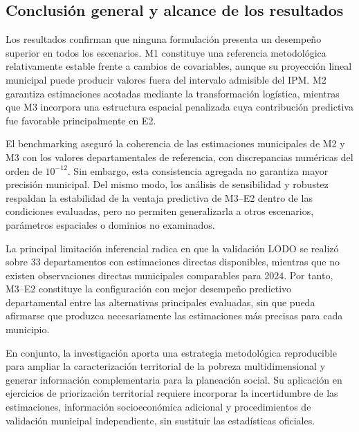 \subsection*{Conclusión general y alcance de los resultados}

Los resultados confirman que ninguna formulación presenta un desempeño superior en todos los escenarios. M1 constituye una referencia metodológica relativamente estable frente a cambios de covariables, aunque su proyección lineal municipal puede producir valores fuera del intervalo admisible del IPM. M2 garantiza estimaciones acotadas mediante la transformación logística, mientras que M3 incorpora una estructura espacial penalizada cuya contribución predictiva fue favorable principalmente en E2.

El benchmarking aseguró la coherencia de las estimaciones municipales de M2 y M3 con los valores departamentales de referencia, con discrepancias numéricas del orden de $10^{-12}$. Sin embargo, esta consistencia agregada no garantiza mayor precisión municipal. Del mismo modo, los análisis de sensibilidad y robustez respaldan la estabilidad de la ventaja predictiva de M3--E2 dentro de las condiciones evaluadas, pero no permiten generalizarla a otros escenarios, parámetros espaciales o dominios no examinados.

La principal limitación inferencial radica en que la validación LODO se realizó sobre 33 departamentos con estimaciones directas disponibles, mientras que no existen observaciones directas municipales comparables para 2024. Por tanto, M3--E2 constituye la configuración con mejor desempeño predictivo departamental entre las alternativas principales evaluadas, sin que pueda afirmarse que produzca necesariamente las estimaciones más precisas para cada municipio.

En conjunto, la investigación aporta una estrategia metodológica reproducible para ampliar la caracterización territorial de la pobreza multidimensional y generar información complementaria para la planeación social. Su aplicación en ejercicios de priorización territorial requiere incorporar la incertidumbre de las estimaciones, información socioeconómica adicional y procedimientos de validación municipal independiente, sin sustituir las estadísticas oficiales.
